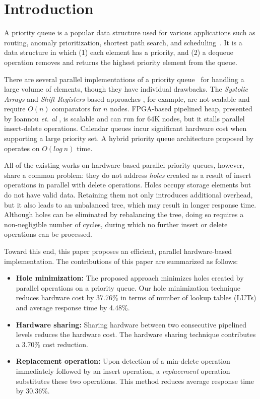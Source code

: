 \section{Introduction}
A priority queue is a popular data structure used for various applications such as routing, anomaly prioritization, shortest path search, and scheduling~\cite{ah1,ah2,ah3}.
It is a data structure in which (1) each element has a priority, and (2) a dequeue operation removes and returns the highest priority element from the queue.

There are several parallel implementations of a priority queue~\cite{hw1,hw2,hw8,hw9,fpga1,fpga2,fpga3} for handling a large volume of elements, though they have individual drawbacks.
The {\it Systolic Arrays} and {\it Shift Registers} based approaches \cite{hw8,hw9}, for example, are not scalable and require $O(n)$ comparators for $n$ nodes.
FPGA-based pipelined heap, presented by Ioannou {\it et. al} \cite{fpga1}, is scalable and can run for 64K nodes, but it stalls parallel insert-delete operations. Calendar queues \cite{hw1} incur significant hardware cost when supporting a large priority set. A hybrid priority queue architecture proposed by \cite{hwsw1} operates on $O(log \ n)$ time.

All of the existing works on hardware-based parallel priority queues, however, share a common problem: they do not address {\it holes} created as a result of insert operations in parallel with delete operations. 
Holes occupy storage elements but do not have valid data. 
Retaining them not only introduces additional overhead, but it also leads to an unbalanced tree, which may result in longer response time.
Although holes can be eliminated by rebalancing the tree, doing so requires a non-negligible number of cycles, during which no further insert or delete operations can be processed.

Toward this end, this paper proposes an efficient, parallel hardware-based implementation.
The contributions of this paper are summarized as follows:
\begin{itemize}
\item {\bf Hole minimization:} The proposed approach minimizes holes created by parallel operations on a priority queue. Our hole minimization technique reduces hardware cost by 37.76\% in terms of number of lookup tables (LUTs) and average response time by 4.48\%.
\item {\bf Hardware sharing:} Sharing hardware between two consecutive pipelined levels reduces the hardware cost. The hardware sharing technique contributes a 3.70\% cost reduction.
\item {\bf Replacement operation:} Upon detection of a min-delete operation immediately followed by an insert operation, a {\it replacement} operation substitutes these two operations. This method reduces average response time by 30.36\%.
\end{itemize}

